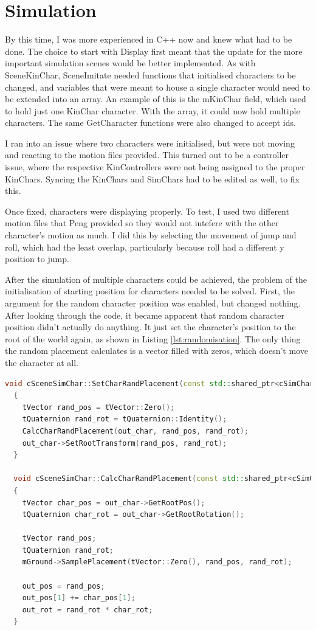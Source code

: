 \documentclass{l4proj}
\begin{document}
\section{Simulation}
By this time, I was more experienced in C++ now and knew what had to be done. The choice to start with Display first meant that the update for the more important simulation scenes would be better implemented. As with SceneKinChar, SceneImitate needed functions that initialised characters to be changed, and variables that were meant to house a single character would need to be extended into an array. An example of this is the mKinChar field, which used to hold just one KinChar character. With the array, it could now hold multiple characters. The same GetCharacter functions were also changed to accept ids.

I ran into an issue where two characters were initialised, but were not moving and reacting to the motion files provided. This turned out to be a controller issue, where the respective KinControllers were not being assigned to the proper KinChars. Syncing the KinChars and SimChars had to be edited as well, to fix this.

Once fixed, characters were displaying properly. To test, I used two different motion files that Peng provided so they would not intefere with the other character's motion as much. I did this by selecting the movement of jump and roll, which had the least overlap, particularly because roll had a different y position to jump.

After the simulation of multiple characters could be achieved, the problem of the initialisation of starting position for characters needed to be solved. First, the argument for the random character position was enabled, but changed nothing. After looking through the code, it became apparent that random character position didn't actually do anything. It just set the character's position to the root of the world again, as shown in Listing \ref{lst:randomisation}. The only thing the random placement calculates is a vector filled with zeros, which doesn't move the character at all.

\begin{lstlisting}[language=C++, float, caption={The function related to character position randomisation}, label=lst:randomisation]
  void cSceneSimChar::SetCharRandPlacement(const std::shared_ptr<cSimCharacter>& out_char)
  {
    tVector rand_pos = tVector::Zero();
    tQuaternion rand_rot = tQuaternion::Identity();
    CalcCharRandPlacement(out_char, rand_pos, rand_rot);
    out_char->SetRootTransform(rand_pos, rand_rot);
  }

  void cSceneSimChar::CalcCharRandPlacement(const std::shared_ptr<cSimCharacter>& out_char, tVector& out_pos, tQuaternion& out_rot)
  {
    tVector char_pos = out_char->GetRootPos();
    tQuaternion char_rot = out_char->GetRootRotation();

    tVector rand_pos;
    tQuaternion rand_rot;
    mGround->SamplePlacement(tVector::Zero(), rand_pos, rand_rot);

    out_pos = rand_pos;
    out_pos[1] += char_pos[1];
    out_rot = rand_rot * char_rot;
  }

\end{lstlisting}
\end{document}
